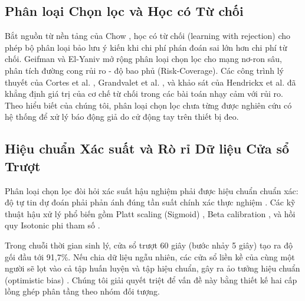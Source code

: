 \documentclass[conference]{IEEEtran}
\begin{document}
\subsection{Phân loại Chọn lọc và Học có Từ chối}
Bắt nguồn từ nền tảng của Chow \cite{chow1970optimum}, học có từ chối (learning with rejection) cho phép bộ phân loại bảo lưu ý kiến khi chi phí phán đoán sai lớn hơn chi phí từ chối. Geifman và El-Yaniv \cite{geifman2017selective, geifman2019selectivenet} mở rộng phân loại chọn lọc cho mạng nơ-ron sâu, phân tích đường cong rủi ro - độ bao phủ (Risk-Coverage). Các công trình lý thuyết của Cortes et al. \cite{cortes2016learning}, Grandvalet et al. \cite{grandvalet2008support}, và khảo sát của Hendrickx et al. \cite{hendrickx2024machine} đã khẳng định giá trị của cơ chế từ chối trong các bài toán nhạy cảm với rủi ro. Theo hiểu biết của chúng tôi, phân loại chọn lọc chưa từng được nghiên cứu có hệ thống để xử lý báo động giả do cử động tay trên thiết bị đeo.

\subsection{Hiệu chuẩn Xác suất và Rò rỉ Dữ liệu Cửa sổ Trượt}
Phân loại chọn lọc đòi hỏi xác suất hậu nghiệm phải được hiệu chuẩn chuẩn xác: độ tự tin dự đoán phải phản ánh đúng tần suất chính xác thực nghiệm \cite{guo2017calibration}. Các kỹ thuật hậu xử lý phổ biến gồm Platt scaling (Sigmoid) \cite{platt1999probabilistic}, Beta calibration \cite{kull2017beta}, và hồi quy Isotonic phi tham số \cite{zadrozny2002transforming, niculescu2005predicting}.

Trong chuỗi thời gian sinh lý, cửa sổ trượt 60 giây (bước nhảy 5 giây) tạo ra độ gối đầu tới 91,7\%. Nếu chia dữ liệu ngẫu nhiên, các cửa sổ liền kề của cùng một người sẽ lọt vào cả tập huấn luyện và tập hiệu chuẩn, gây ra ảo tưởng hiệu chuẩn (optimistic bias) \cite{saeb2017need, little2017using}. Chúng tôi giải quyết triệt để vấn đề này bằng thiết kế hai cấp lồng ghép phân tầng theo nhóm đối tượng.
\end{document}
